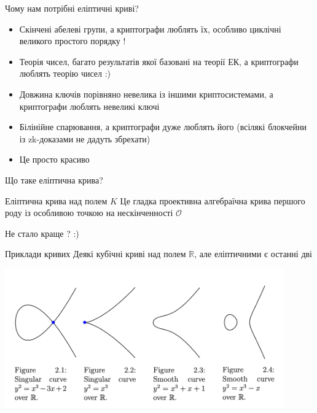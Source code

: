 \documentclass[10pt]{beamer}
\begin{document}
\begin{darkframes}
\begin{frame}{Чому нам потрібні еліптичні криві?}
  \begin{itemize}
    \item Скінчені абелеві групи, а криптографи люблять їх, особливо циклічні великого простого порядку !
    \item Теорія чисел, багато результатів якої базовані на теорії ЕК, а криптографи люблять теорію чисел :)
    \item Довжина ключів порівняно невелика із іншими криптосистемами, а криптографи люблять невеликі ключі
    \item Білінійне спарювання, а криптографи дуже люблять його (всілякі блокчейни із zk-доказами не дадуть збрехати)
    \item Це просто красиво
  \end{itemize}
\end{frame}

\begin{frame}{Що таке еліптична крива?}
\begin{block}{Еліптична крива над полем $K$}
Це гладка проективна алгебраїчна крива першого роду із особливою точкою на нескінченності $\mathcal{O}$
\end{block}
Не стало краще ? :)
\end{frame}
\begin{frame}{Приклади кривих}
    Деякі кубічні криві над полем $\mathbb{R}$, але еліптичними є останні дві 
    \begin{center}
    \includegraphics[width=0.9\textwidth]{resources/curves.png}
    \end{center}
    

\end{frame}
\end{darkframes}
\end{document}
